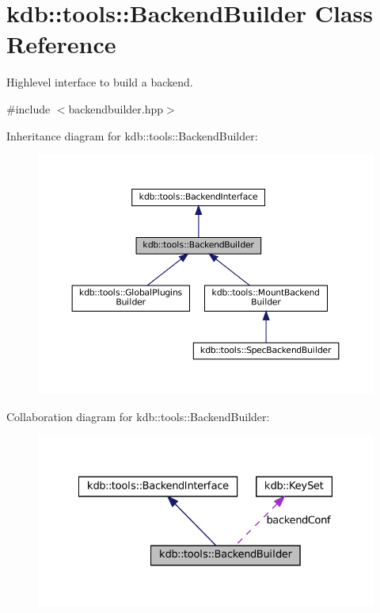 \hypertarget{classkdb_1_1tools_1_1BackendBuilder}{}\section{kdb\+::tools\+::Backend\+Builder Class Reference}
\label{classkdb_1_1tools_1_1BackendBuilder}


Highlevel interface to build a backend.  




{\ttfamily \#include $<$backendbuilder.\+hpp$>$}



Inheritance diagram for kdb\+::tools\+::Backend\+Builder\+:
\nopagebreak
\begin{figure}[H]
\begin{center}
\leavevmode
\includegraphics[width=350pt]{classkdb_1_1tools_1_1BackendBuilder__inherit__graph}
\end{center}
\end{figure}


Collaboration diagram for kdb\+::tools\+::Backend\+Builder\+:
\nopagebreak
\begin{figure}[H]
\begin{center}
\leavevmode
\includegraphics[width=328pt]{classkdb_1_1tools_1_1BackendBuilder__coll__graph}
\end{center}
\end{figure}
